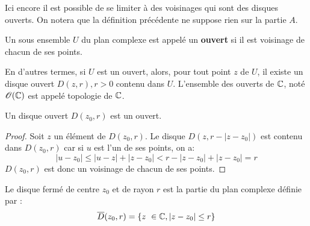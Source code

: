 Ici encore il est possible de se limiter à des voisinages qui sont des disques ouverts. On notera que la définition précédente ne suppose rien sur la partie $A$.
\begin{fdefn} Un sous ensemble $U$ du plan complexe est appelé un \textbf{ouvert} si il est voisinage de chacun de ses points. 
\end{fdefn}
En d'autres termes, si $U$ est un ouvert, alors, pour tout point $z$ de $U$, il existe un disque ouvert $D(z,r),r>0$ contenu dans $U$. L'ensemble des ouverts de $\mathbb{C}$, noté $\mathcal{O}(\mathbb{C})$ est appelé topologie de $\mathbb{C}$.

\begin{prop}
Un disque ouvert $D(z_0,r)$ est un ouvert. 
\end{prop}
\begin{proof}
	Soit $z$ un élément de $D(z_0,r)$. Le disque $D(z,r-|z-z_0|)$ est contenu dans $D(z_0,r)$ car si $u$ est l'un de ses points, on a:
	\[
	|u-z_0| \leq |u-z| + |z-z_0| < r - |z-z_0| + |z-z_0| = r
	\]
	$D(z_0,r)$ est donc un voisinage de chacun de ses points. 
\end{proof}

\begin{defn}
Le disque fermé de centre $z_0$ et de rayon $r$ est la partie du plan complexe définie par :
\[
\overline{D}(z_0,r) = \{ z  \in \C , |z-z_0| \leq r  \}
\]
\end{defn}

